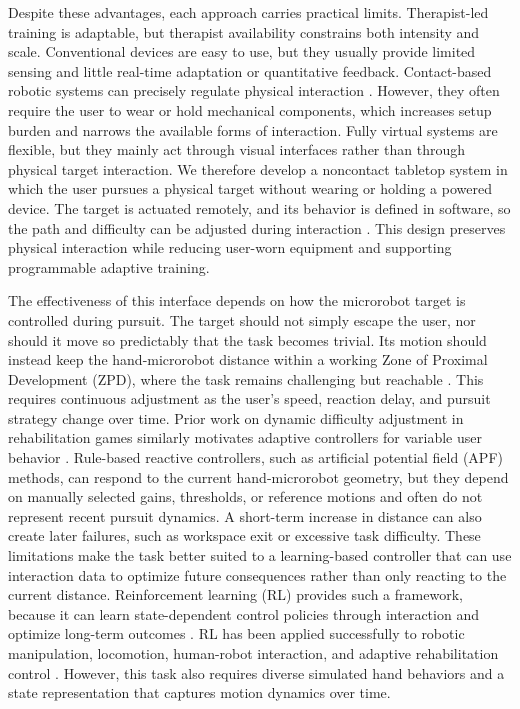 \documentclass[lettersize,journal]{IEEEtran}
\begin{document}
Despite these advantages, each approach carries practical limits. Therapist-led training is adaptable, but therapist availability constrains both intensity and scale. Conventional devices are easy to use, but they usually provide limited sensing and little real-time adaptation or quantitative feedback. Contact-based robotic systems can precisely regulate physical interaction \cite{arantesAdaptiveAAN2023}. However, they often require the user to wear or hold mechanical components, which increases setup burden and narrows the available forms of interaction. Fully virtual systems are flexible, but they mainly act through visual interfaces rather than through physical target interaction. We therefore develop a noncontact tabletop system in which the user pursues a physical target without wearing or holding a powered device. The target is actuated remotely, and its behavior is defined in software, so the path and difficulty can be adjusted during interaction \cite{sittiBiomedicalMicrorobots2015,yangMagneticActuation2020,miaoSoftMagneticRobots2023}. This design preserves physical interaction while reducing user-worn equipment and supporting programmable adaptive training.

The effectiveness of this interface depends on how the microrobot target is controlled during pursuit. The target should not simply escape the user, nor should it move so predictably that the task becomes trivial. Its motion should instead keep the hand-microrobot distance within a working Zone of Proximal Development (ZPD), where the task remains challenging but reachable \cite{vygotskyMindSociety1978,hocineSeriousGameAdaptation2015}. This requires continuous adjustment as the user's speed, reaction delay, and pursuit strategy change over time. Prior work on dynamic difficulty adjustment in rehabilitation games similarly motivates adaptive controllers for variable user behavior \cite{shangDynamicDifficulty2025,ajaniParetoDDA2023,vitekovaDDAReview2026}. Rule-based reactive controllers, such as artificial potential field (APF) methods, can respond to the current hand-microrobot geometry, but they depend on manually selected gains, thresholds, or reference motions and often do not represent recent pursuit dynamics. A short-term increase in distance can also create later failures, such as workspace exit or excessive task difficulty. These limitations make the task better suited to a learning-based controller that can use interaction data to optimize future consequences rather than only reacting to the current distance. Reinforcement learning (RL) provides such a framework, because it can learn state-dependent control policies through interaction and optimize long-term outcomes \cite{suttonBartoRL2018}. RL has been applied successfully to robotic manipulation, locomotion, human-robot interaction, and adaptive rehabilitation control \cite{koberRLRobotics2013,schulmanPPO2017,molleOnlineRLRehab2025,pareekAR3n2024,zhangImpedanceLandscapes2022,pelosiPersonalizedRehab2024}. However, this task also requires diverse simulated hand behaviors and a state representation that captures motion dynamics over time.
\end{document}
